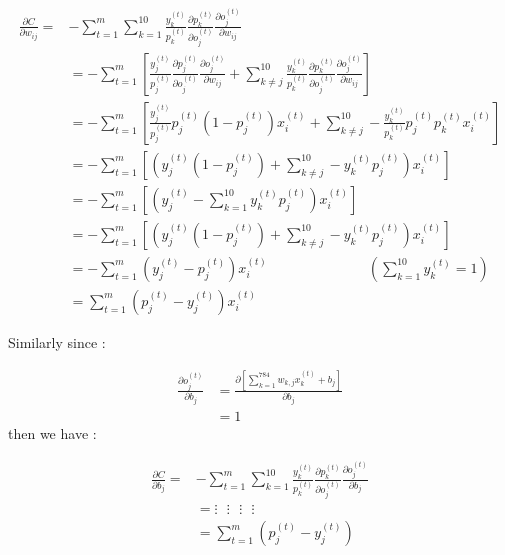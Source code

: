\documentclass{article}
\begin{document}
\begin{align*}
\frac{\partial C}{\partial w_{ij}} =& - \sum_{t=1}^{m}\sum_{k=1}^{10}
\frac{y^{(t)}_{k}}{ p^{(t)}_{k}}
\frac{\partial  p^{(t)}_{k}}{\partial o^{(t)}_{j}}
\frac{\partial  o^{(t)}_{j}}{\partial w_{ij}} \\
&= - \sum_{t=1}^{m}\left[
\frac{y^{(t)}_{j}}{ p^{(t)}_{j}}
\frac{\partial  p^{(t)}_{j}}{\partial o^{(t)}_{j}}
\frac{\partial  o^{(t)}_{j}}{\partial w_{ij}}
+
\sum_{k \neq j }^{10}
\frac{y^{(t)}_{k}}{ p^{(t)}_{k}}
\frac{\partial  p^{(t)}_{k}}{\partial o^{(t)}_{j}}
\frac{\partial  o^{(t)}_{j}}{\partial w_{ij}}
\right]
\\
&= - \sum_{t=1}^{m}\left[
\frac{y^{(t)}_{j}}{ p^{(t)}_{j}} p^{(t)}_{j}(1-p^{(t)}_{j}) x_{i}^{(t)}
+ \sum_{k \neq j }^{10} -\frac{y^{(t)}_{k}}{ p^{(t)}_{k}} p^{(t)}_{j}p^{(t)}_{k} x_{i}^{(t)} \right] \\
&= - \sum_{t=1}^{m}\left[ \left(  y^{(t)}_{j}(1-p^{(t)}_{j})
+ \sum_{k \neq j }^{10} - y^{(t)}_{k} p^{(t)}_{j} \right)x_{i}^{(t)} \right] \\
&= - \sum_{t=1}^{m}\left[ \left( y^{(t)}_{j}- \sum_{k = 1 }^{10} y^{(t)}_{k}p^{(t)}_{j}\right) x_{i}^{(t)} \right]
\\
&= - \sum_{t=1}^{m}\left[ \left(  y^{(t)}_{j}(1-p^{(t)}_{j})
+\sum_{k \neq j }^{10} - y^{(t)}_{k} p^{(t)}_{j} \right)x_{i}^{(t)} \right] \\
&= - \sum_{t=1}^{m}  \left( y^{(t)}_{j} - p^{(t)}_{j} \right) x_{i}^{(t)}
\hspace{3cm} \left(\sum_{k = 1 }^{10}
 y^{(t)}_{k} =1 \right) \\
&= \sum_{t=1}^{m}  \left( p^{(t)}_{j}-y^{(t)}_{j} \right)x_{i}^{(t)}
\end{align*}

Similarly since :

\begin{align*}
\frac{\partial  o^{(t)}_{j}}{\partial b_{j}} &= \frac{\partial  \left[
\sum_{k=1}^{784}w_{k,j}x_{k}^{(t)} + b_j \right]}{\partial b_{j}}  \\
&= 1
\end{align*}
then we have :


\begin{align*}
\frac{\partial C}{\partial b_{j}} =& - \sum_{t=1}^{m}\sum_{k=1}^{10}
\frac{y^{(t)}_{k}}{ p^{(t)}_{k}}
\frac{\partial  p^{(t)}_{k}}{\partial o^{(t)}_{j}}
\frac{\partial  o^{(t)}_{j}}{\partial b_{j}} \\
&= \vdots \ \ \ \vdots \ \ \ \vdots \ \ \ \vdots  \\
&= \sum_{t=1}^{m}  \left(p^{(t)}_{j}-y^{(t)}_{j}\right)
\end{align*}
\end{document}
